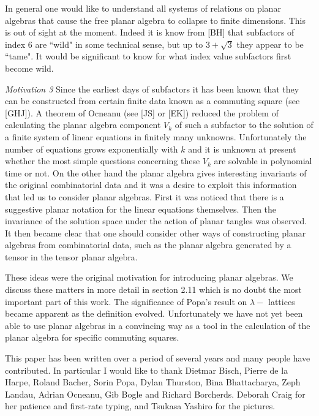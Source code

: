In general one would like to understand all systems of relations
on planar algebras that cause the free planar algebra to collapse
to finite dimensions. This is out of sight at the moment. 
Indeed it is know from [BH] that subfactors of index $6$ are 
``wild" in some technical sense, but up to $3+\sqrt{3}$ they
appear to be ``tame". It would be significant to know for what   
index value subfactors first become wild.

{\it Motivation 3 } Since the earliest days of subfactors it
has been known that they can be constructed from certain 
finite data known as a commuting square (see [GHJ]). A theorem 
of Ocneanu (see [JS] or [EK]) reduced the problem of  
calculating the planar algebra component $V_k$ of such a subfactor
to the solution of a finite system of linear equations in finitely
many unknowns. Unfortunately the number of equations 
grows exponentially with $k$ and it is unknown at present whether 
the most simple questions concerning these $V_k$ are solvable
in polynomial time or not. On the other hand the planar algebra
gives interesting invariants of the original combinatorial 
data and it was a desire to exploit this information that led
us to consider planar algebras. First it was noticed that there
is a suggestive planar notation for the linear equations themselves.
Then the invariance of the solution space under the action
of planar tangles was observed. It then became clear that 
one should consider other ways of constructing planar 
algebras from combinatorial data, such as the planar
algebra generated by a tensor in the tensor planar algebra.

These ideas were the original motivation for introducing planar
algebras. We discuss these matters in more detail in section
2.11 which is no doubt the most important part of this work.
The significance of Popa's result on $\lambda -$ lattices became
apparent as the definition evolved. Unfortunately we have
not yet been able to use planar algebras in a convincing
way as a tool in the calculation of the planar algebra for
specific commuting squares.

This paper has been written over a period of several years and
many people have contributed. In particular I would like to
thank Dietmar Bisch, Pierre de la Harpe, Roland Bacher, Sorin Popa,
Dylan Thurston, Bina Bhattacharya, Zeph Landau, Adrian Ocneanu, Gib Bogle and 
Richard Borcherds. Deborah Craig for her 
patience and first-rate typing, and Tsukasa Yashiro for the pictures. 


